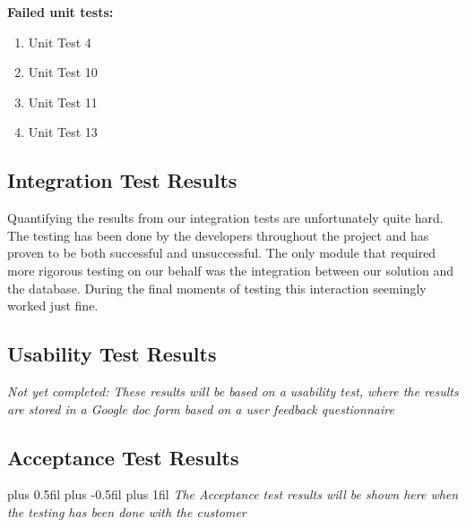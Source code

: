 \textbf{Failed unit tests:}
\begin{enumerate}
    \item Unit Test 4
    \item Unit Test 10
    \item Unit Test 11
    \item Unit Test 13
\end{enumerate}
\subsection{Integration Test Results}
Quantifying the results from our integration tests are unfortunately quite hard. The testing has been done by the developers throughout the project and has proven to be both successful and unsuccessful. The only module that required more rigorous testing on our behalf was the integration between our solution and the database. During the final moments of testing this interaction seemingly worked just fine. 
\subsection{Usability Test Results}

\textit{Not yet completed: These results will be based on a usability test, where the results are stored in a Google doc form based on a user feedback questionnaire}

\subsection{Acceptance Test Results}

\begingroup
\leftskip=0cm plus 0.5fil \rightskip=0cm plus -0.5fil
\parfillskip=0cm plus 1fil
\textit{The Acceptance test results will be shown here when the testing has been done with the customer}\par
\endgroup
